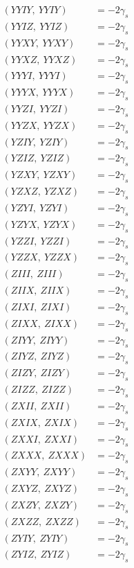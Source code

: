 \documentclass{article}
\begin{document}
\begin{align*}
  (YYIY,\ YYIY) &= - 2 \gamma_{s} \\
  (YYIZ,\ YYIZ) &= - 2 \gamma_{s} \\
  (YYXY,\ YYXY) &= - 2 \gamma_{s} \\
  (YYXZ,\ YYXZ) &= - 2 \gamma_{s} \\
  (YYYI,\ YYYI) &= - 2 \gamma_{s} \\
  (YYYX,\ YYYX) &= - 2 \gamma_{s} \\
  (YYZI,\ YYZI) &= - 2 \gamma_{s} \\
  (YYZX,\ YYZX) &= - 2 \gamma_{s} \\
  (YZIY,\ YZIY) &= - 2 \gamma_{s} \\
  (YZIZ,\ YZIZ) &= - 2 \gamma_{s} \\
  (YZXY,\ YZXY) &= - 2 \gamma_{s} \\
  (YZXZ,\ YZXZ) &= - 2 \gamma_{s} \\
  (YZYI,\ YZYI) &= - 2 \gamma_{s} \\
  (YZYX,\ YZYX) &= - 2 \gamma_{s} \\
  (YZZI,\ YZZI) &= - 2 \gamma_{s} \\
  (YZZX,\ YZZX) &= - 2 \gamma_{s} \\
  (ZIII,\ ZIII) &= - 2 \gamma_{s} \\
  (ZIIX,\ ZIIX) &= - 2 \gamma_{s} \\
  (ZIXI,\ ZIXI) &= - 2 \gamma_{s} \\
  (ZIXX,\ ZIXX) &= - 2 \gamma_{s} \\
  (ZIYY,\ ZIYY) &= - 2 \gamma_{s} \\
  (ZIYZ,\ ZIYZ) &= - 2 \gamma_{s} \\
  (ZIZY,\ ZIZY) &= - 2 \gamma_{s} \\
  (ZIZZ,\ ZIZZ) &= - 2 \gamma_{s} \\
  (ZXII,\ ZXII) &= - 2 \gamma_{s} \\
  (ZXIX,\ ZXIX) &= - 2 \gamma_{s} \\
  (ZXXI,\ ZXXI) &= - 2 \gamma_{s} \\
  (ZXXX,\ ZXXX) &= - 2 \gamma_{s} \\
  (ZXYY,\ ZXYY) &= - 2 \gamma_{s} \\
  (ZXYZ,\ ZXYZ) &= - 2 \gamma_{s} \\
  (ZXZY,\ ZXZY) &= - 2 \gamma_{s} \\
  (ZXZZ,\ ZXZZ) &= - 2 \gamma_{s} \\
  (ZYIY,\ ZYIY) &= - 2 \gamma_{s} \\
  (ZYIZ,\ ZYIZ) &= - 2 \gamma_{s} \\

\end{align*}
\end{document}
